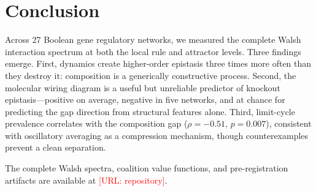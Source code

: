 \documentclass[11pt]{article}
\begin{document}
\section{Conclusion}
\label{sec:conclusion}

Across 27 Boolean gene regulatory networks, we measured the complete
Walsh interaction spectrum at both the local rule and attractor
levels. Three findings emerge. First, dynamics create higher-order
epistasis three times more often than they destroy it: composition
is a generically constructive process. Second, the molecular wiring
diagram is a useful but unreliable predictor of knockout
epistasis---positive on average, negative in five networks, and at
chance for predicting the gap direction from structural features
alone. Third, limit-cycle prevalence correlates with the composition
gap ($\rho = -0.51$, $p = 0.007$), consistent with oscillatory
averaging as a compression mechanism, though counterexamples prevent
a clean separation.

The complete Walsh spectra, coalition value functions, and
pre-registration artifacts are available at
\textcolor{red}{[URL: repository]}.





\end{document}
